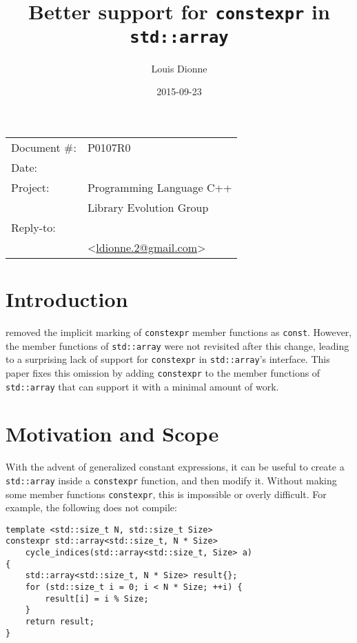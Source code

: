 \documentclass[11pt]{article}
\date{}
\title{Better support for {\tt constexpr} in {\tt std::array}}
\begin{document}
\maketitle\vspace{-2cm}

\begin{flushright}
  \begin{tabular}{ll}
  Document \#:&P0107R0\\
  Date:       &\date{2015-09-23}\\
  Project:    &Programming Language C++\\
              &Library Evolution Group\\
  Reply-to:   &\author{Louis Dionne}\\
              &\textless\href{mailto:ldionne.2@gmail.com}{ldionne.2@gmail.com}\textgreater
  \end{tabular}
\end{flushright}

\section{Introduction}
\cite{N3598} removed the implicit marking of {\tt constexpr} member functions as
{\tt const}. However, the member functions of {\tt std::array} were not revisited
after this change, leading to a surprising lack of support for {\tt constexpr} in
{\tt std::array}'s interface. This paper fixes this omission by adding {\tt constexpr}
to the member functions of {\tt std::array} that can support it with a minimal amount
of work.


\section{Motivation and Scope}
With the advent of generalized constant expressions, it can be useful to create
a {\tt std::array} inside a {\tt constexpr} function, and then modify it. Without
making some member functions {\tt constexpr}, this is impossible or overly difficult. For example, the following does not compile:

\begin{lstlisting}[style=base]
template <std::size_t N, std::size_t Size>
constexpr std::array<std::size_t, N * Size>
    cycle_indices(std::array<std::size_t, Size> a)
{
    std::array<std::size_t, N * Size> result{};
    for (std::size_t i = 0; i < N * Size; ++i) {
        result[i] = i % Size;
    }
    return result;
}
\end{lstlisting}
\end{document}
